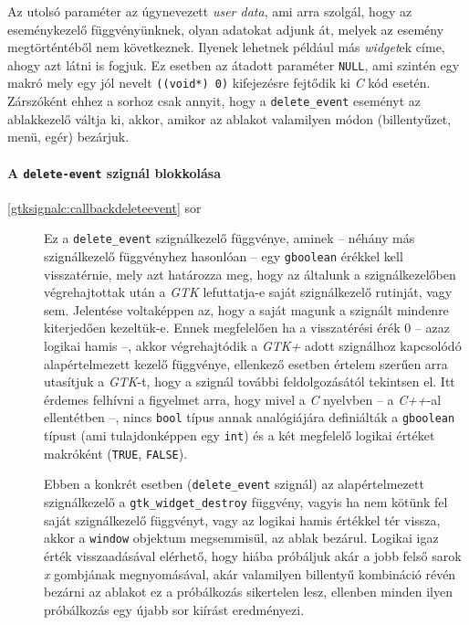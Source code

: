 \begin{description}
Az utolsó paraméter az úgynevezett \textit{user data}, ami arra szolgál, hogy az eseménykezelő függvényünknek, olyan adatokat adjunk át, melyek az esemény megtörténtéből nem következnek. Ilyenek lehetnek például más \textit{widget}ek címe, ahogy azt látni is fogjuk. Ez esetben az átadott paraméter \texttt{NULL}, ami szintén egy makró mely egy jól nevelt \texttt{((void*) 0)} kifejezésre fejtődik ki \textit{C} kód esetén. Zárszóként ehhez a sorhoz csak annyit, hogy a \texttt{delete\_event} eseményt az ablakkezelő váltja ki, akkor, amikor az ablakot valamilyen módon (billentyűzet, menü, egér) bezárjuk.
\end{description}

\paragraph{A \texttt{delete-event} szignál blokkolása}

\begin{description}
 \item[\ref{gtksignalc:callbackdeleteevent} sor] Ez a \texttt{delete\_event} szignálkezelő függvénye, aminek -- néhány más szignálkezelő függvényhez hasonlóan -- egy \texttt{gboolean} érékkel kell visszatérnie, mely azt határozza meg, hogy az általunk a szignálkezelőben végrehajtottak után a \textit{GTK} lefuttatja-e saját szignálkezelő rutinját, vagy sem. Jelentése voltaképpen az, hogy a saját magunk a szignált mindenre kiterjedően kezeltük-e. Ennek megfelelően ha a visszatérési érék 0 -- azaz logikai hamis --, akkor végrehajtódik a \textit{GTK+} adott szignálhoz kapcsolódó alapértelmezett kezelő függvénye, ellenkező esetben értelem szerűen arra utasítjuk a \textit{GTK}-t, hogy a szignál további feldolgozásától tekintsen el. Itt érdemes felhívni a figyelmet arra, hogy mivel a \textit{C} nyelvben -- a \textit{C++}-al ellentétben --, nincs \texttt{bool} típus annak analógiájára definiálták a \texttt{gboolean} típust (ami tulajdonképpen egy \texttt{int}) és a két megfelelő logikai értéket makróként (\texttt{TRUE}, \texttt{FALSE}).

Ebben a konkrét esetben (\texttt{delete\_event} szignál) az alapértelmezett szignálkezelő a \texttt{gtk\_widget\_destroy} függvény, vagyis ha nem kötünk fel saját szignálkezelő függvényt, vagy az logikai hamis értékkel tér vissza, akkor a \texttt{window} objektum megsemmisül, az ablak bezárul. Logikai igaz érték visszaadásával elérhető, hogy hiába próbáljuk akár a jobb felső sarok \textit{x} gombjának megnyomásával, akár valamilyen billentyű kombináció révén bezárni az ablakot ez a próbálkozás sikertelen lesz, ellenben minden ilyen próbálkozás egy újabb sor kiírást eredményezi. 
\end{description}

